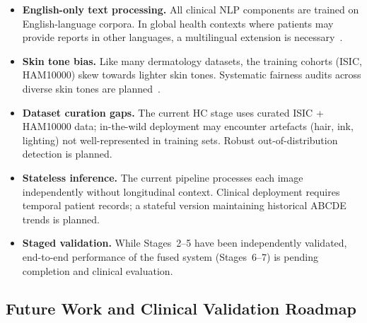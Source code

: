 \documentclass[conference]{IEEEtran}
\begin{document}
\begin{itemize}[leftmargin=*]
    \item \textbf{English-only text processing.} All clinical NLP components
          are trained on English-language corpora. In global health contexts
          where patients may provide reports in other languages, a multilingual
          extension is necessary~\cite{pfohl2022_multilingual_clinical_nlp}.
    \item \textbf{Skin tone bias.} Like many dermatology datasets, the training
          cohorts (ISIC, HAM10000) skew towards lighter skin tones. Systematic
          fairness audits across diverse skin tones are planned~\cite{buolamwini2019_gender_shades,
          kinyanjui2021_color_bias_skin}.
    \item \textbf{Dataset curation gaps.} The current HC stage uses curated
          ISIC + HAM10000 data; in-the-wild deployment may encounter artefacts
          (hair, ink, lighting) not well-represented in training sets. Robust
          out-of-distribution detection is planned.
    \item \textbf{Stateless inference.} The current pipeline processes each image
          independently without longitudinal context. Clinical deployment requires
          temporal patient records; a stateful version maintaining historical
          ABCDE trends is planned.
    \item \textbf{Staged validation.} While Stages~2--5 have been independently
          validated, end-to-end performance of the fused system (Stages~6--7) is
          pending completion and clinical evaluation.
\end{itemize}

\subsection{Future Work and Clinical Validation Roadmap}
\end{document}
